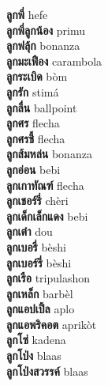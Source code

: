 \textbf{ ลูกพี่  } hefe \\
\textbf{ ลูกพี่ลูกน้อง  } primu \\
\textbf{ ลูกฟลุ้ก  } bonanza \\
\textbf{ ลูกมะเฟือง  } carambola \\
\textbf{ ลูกระเบิด  } bòm \\
\textbf{ ลูกรัก  } stimá \\
\textbf{ ลูกลื่น  } ballpoint \\
\textbf{ ลูกศร  } flecha \\
\textbf{ ลูกศรชี้  } flecha \\
\textbf{ ลูกส้มหล่น  } bonanza \\
\textbf{ ลูกอ่อน  } bebi \\
\textbf{ ลูกเกาทัณฑ์  } flecha \\
\textbf{ ลูกเชอร์รี่  } chèri \\
\textbf{ ลูกเด็กเล็กแดง  } bebi \\
\textbf{ ลูกเต๋า  } dou \\
\textbf{ ลูกเบอรี่  } bèshi \\
\textbf{ ลูกเบอร์รี่  } bèshi \\
\textbf{ ลูกเรือ  } tripulashon \\
\textbf{ ลูกเหล็ก  } barbèl \\
\textbf{ ลูกแอปเปิ้ล  } aplo \\
\textbf{ ลูกแอพริคอต  } aprikòt \\
\textbf{ ลูกโซ่  } kadena \\
\textbf{ ลูกโป่ง  } blaas \\
\textbf{ ลูกโป่งสวรรค์  } blaas \\
